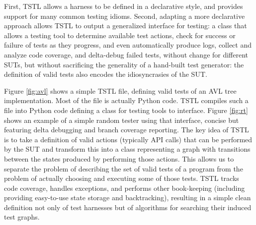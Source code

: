 \documentclass{sig-alternate}
\begin{document}
First, TSTL allows a harness to be defined in a declarative style, and
provides support for many common testing idioms.  Second, adapting a
more declarative approach allows TSTL to output a generalized
interface for testing: a class that allows a testing tool to determine
available test actions, check for success or failure of tests as they
progress, and even automatically produce logs, collect and analyze
code coverage, and delta-debug failed tests, without change for
different SUTs, but without sacrificing the generality of a hand-built
test generator: the definition of valid tests also encodes the
idiosyncrasies of the SUT.

Figure \ref{fig:avl} shows a simple TSTL file, defining valid tests of
an AVL tree implementation.  Most of the file is actually Python code.
TSTL compiles such a file into Python code defining a class for
testing tools to interface.  Figure \ref{fig:rt} shows an example of a
simple random tester using that interface, concise but featuring delta
debugging \cite{DD} and branch coverage reporting.  The key idea of TSTL is to
take a definition of valid actions (typically API calls) that can
be performed by the SUT and transform this into a class representing a
graph with transitions between the states produced by performing those
actions.  This allows us to separate the problem of describing the set
of valid tests of a program from the problem of actually choosing and
executing some of those tests.  
TSTL tracks code coverage, handles exceptions, and performs
other book-keeping (including providing easy-to-use state storage and
backtracking), resulting in a simple clean definition not only of
test harnesses but of algorithms for searching their induced test graphs.
\end{document}
